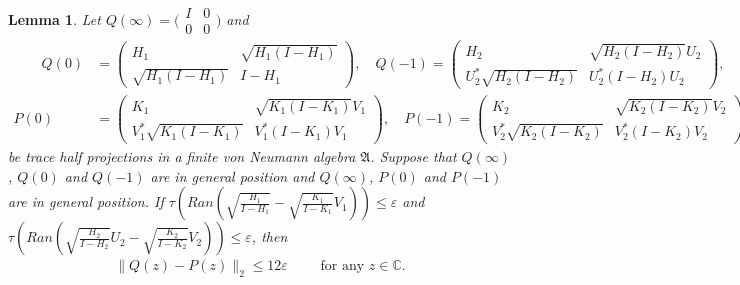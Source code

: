 \documentclass[a4paper,10pt]{amsart}
\newtheorem{lemma}{Lemma}[section]
\newcommand{\AAA}{\mathfrak A}
\newcommand{\C}{\mathbb C} %
\begin{document}
\begin{lemma}
Let $Q(\infty) = \bigl(\begin{smallmatrix}
           I & 0\\
           0 & 0 
   \end{smallmatrix} \bigr)$ and 
   \begin{align*}
       \qquad Q(0) &= \begin{pmatrix}
           H_{1} & \sqrt{H_{1}(I-H_{1})}\\
           \sqrt{H_{1}(I-H_{1})} & I-H_1
        \end{pmatrix}, \quad  
        Q(-1) = \begin{pmatrix}
            H_{2} & \sqrt{H_{2}(I-H_{2})}U_{2}\\
            U_{2}^{*}\sqrt{H_{2}(I-H_{2})} & U_{2}^{*}(I-H_2)U_{2}
        \end{pmatrix},\\ 
        P(0) &= \begin{pmatrix}
        K_{1} & \sqrt{K_{1}(I-K_{1})}V_{1}\\
        V^{*}_{1}\sqrt{K_{1}(I-K_{1})} & V^{*}_{1}(I-K_1)V_{1}
        \end{pmatrix}, \quad
        P(-1) = \begin{pmatrix}
            K_{2} & \sqrt{K_{2}(I-K_{2})}V_{2}\\
            V_{2}^{*}\sqrt{K_{2}(I-K_{2})} & V_{2}^{*}(I-K_2)V_{2}
        \end{pmatrix}
    \end{align*}
   be trace half projections in a finite von Neumann algebra $\AAA$.
   Suppose that $Q(\infty)$,
   $Q(0)$ and $Q(-1)$ are in general position and  
   $Q(\infty)$, $P(0)$ and $P(-1)$ are in general position. 
   If $\tau(Ran(\sqrt{\frac{H_1}{I-H_1}} - 
   \sqrt{\frac{K_1}{I-K_1}}V_1))\leq \varepsilon$
   and $\tau(Ran(\sqrt{\frac{H_2}{I-H_2}}U_2 - 
    \sqrt{\frac{K_2}{I-K_2}}V_2))\leq \varepsilon$,
   then
   \begin{align*}
       \|Q(z) - P(z)\|_2 \leq 12\varepsilon 
       \qquad \mbox{ for any $z \in \C$}. 
   \end{align*}
\end{lemma}
\end{document}
